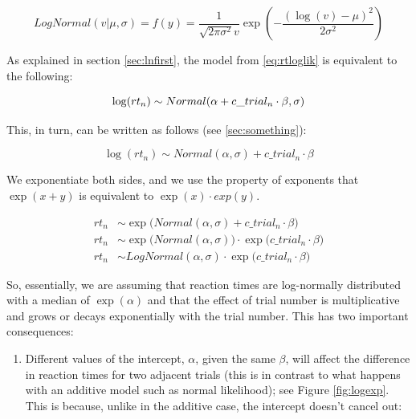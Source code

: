 \documentclass[12pt,]{krantz}
\providecommand{\tightlist}{%
  \setlength{\itemsep}{0pt}\setlength{\parskip}{0pt}}
\theoremstyle{definition}
\theoremstyle{definition}
\theoremstyle{definition}
\theoremstyle{remark}
\begin{document}
\begin{equation}
LogNormal(v|\mu,\sigma)=f(y)= \frac{1}{\sqrt{2\pi \sigma^2}v} \exp \left(-\frac{(\log(v)-\mu)^2}{2\sigma^2} \right)
\end{equation}

As explained in section \ref{sec:lnfirst}, the model from
\eqref{eq:rtloglik} is equivalent to the following:

\begin{equation}
\log(rt_n) \sim Normal(\alpha + c\_trial_n \cdot \beta,\sigma)\\
\end{equation}

This, in turn, can be written as follows (see \ref{sec:something}):

\begin{equation}
\log(rt_n) \sim Normal(\alpha, \sigma) + c\_trial_n \cdot \beta
\label{eq:rtlogliknoncen}
\end{equation}

We exponentiate both sides, and we use the property of exponents that
\(\exp(x+y)\) is equivalent to \(\exp(x) \cdot exp(y)\).

\begin{equation}
\begin{aligned}
rt_n &\sim \exp \big(Normal(\alpha, \sigma)  + c\_trial_n \cdot \beta\big) \\
rt_n &\sim \exp\big(Normal(\alpha, \sigma)\big)   \cdot \exp\big(c\_trial_n \cdot \beta\big) \\
rt_n &\sim LogNormal(\alpha, \sigma)   \cdot \exp\big(c\_trial_n \cdot \beta\big) 
\end{aligned}
\end{equation}

So, essentially, we are assuming that reaction times are log-normally
distributed with a median of \(\exp(\alpha)\) and that the effect of
trial number is multiplicative and grows or decays exponentially with
the trial number. This has two important consequences:

\begin{enumerate}
\def\labelenumi{\arabic{enumi}.}
\tightlist
\item
  Different values of the intercept, \(\alpha\), given the same
  \(\beta\), will affect the difference in reaction times for two
  adjacent trials (this is in contrast to what happens with an additive
  model such as normal likelihood); see Figure \ref{fig:logexp}. This is
  because, unlike in the additive case, the intercept doesn't cancel
  out:
\end{enumerate}
\end{document}
